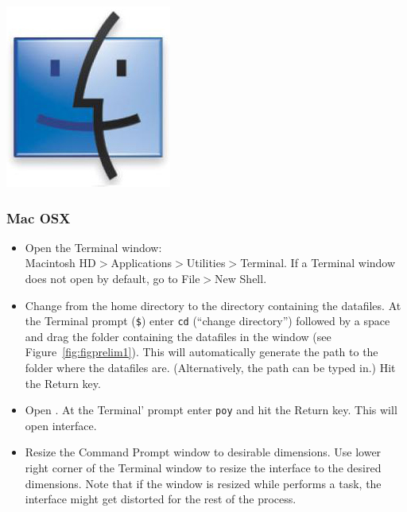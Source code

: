 \begin{flushleft}
	\begin{minipage}[c]{0.075\textwidth}
   		\includegraphics[width=\textwidth]{figures/figLogoMac.jpg}
	\end{minipage}%
	\quad
	\begin{minipage}[t]{0.89\textwidth}
	   	\subsubsection{Mac OSX}
	\end{minipage}
			\begin{itemize}
				\item {Open the Terminal window: \\
				Macintosh HD$>$Applications$>$Utilities$>$Terminal. If a Terminal
				window does not open by default, go to File$>$New Shell.}
				\item{Change from the home directory to the directory containing the
				 datafiles. At the Terminal prompt (\texttt{\$}) enter \texttt{cd} (``change directory'')
				 followed by a space and drag the folder containing the datafiles in the
				 window (see Figure~\ref{fig:figprelim1}). This will automatically generate the path to the
				 folder where the datafiles are. (Alternatively, the path can be typed in.)
				 Hit the Return key.}
				\item{Open \poy. At the Terminal' prompt enter \texttt{poy} and
				hit the Return key. This will open \poy interface.}
				\item {Resize the Command Prompt window to desirable dimensions. Use
				lower right corner of the Terminal window to resize the interface to the desired
				dimensions. Note that if the window is resized while \poy performs a task, the
				interface might get distorted for the rest of the process.}
			\end{itemize}		


\end{flushleft}
